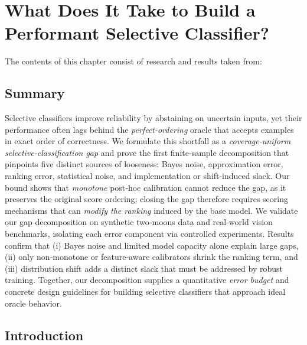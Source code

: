 \newcommand{\E}{\mathbb{E}}
\newcommand{\R}{\mathbb{R}}

\chapter{What Does It Take to Build a Performant Selective Classifier?}
\label{ch:sc_bounds}


\begin{paperref}
\normalfont
The contents of this chapter consist of research and results taken from: \emph{}
\end{paperref}

\section*{Summary}

Selective classifiers improve reliability by abstaining on uncertain inputs, yet their performance often lags behind the \emph{perfect-ordering} oracle that accepts examples in exact order of correctness. We formulate this shortfall as a \emph{coverage‑uniform selective‑classification gap} and prove the first finite‑sample decomposition that pinpoints five distinct sources of looseness: Bayes noise, approximation error, ranking error, statistical noise, and implementation or shift‑induced slack. Our bound shows that \emph{monotone} post‑hoc calibration cannot reduce the gap, as it preserves the original score ordering; closing the gap therefore requires scoring mechanisms that can \emph{modify the ranking} induced by the base model. We validate our gap decomposition on synthetic two‐moons data and real‐world vision benchmarks, isolating each error component via controlled experiments. Results confirm that (i) Bayes noise and limited model capacity alone explain large gaps, (ii) only non‑monotone or feature‑aware calibrators shrink the ranking term, and (iii) distribution shift adds a distinct slack that must be addressed by robust training. Together, our decomposition supplies a quantitative \emph{error budget} and concrete design guidelines for building selective classifiers that approach ideal oracle behavior.

\section{Introduction}
\label{sec:intro}

